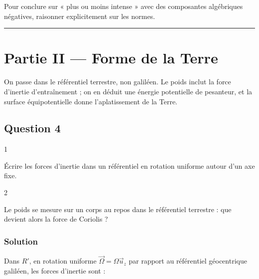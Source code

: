 \documentclass[11pt,a4paper]{article}
\newcommand{\equationajustee}[1]{%
  \sbox{\boiteequation}{$\displaystyle #1$}%
  \ifdim\wd\boiteequation>\linewidth
    \[\resizebox{\linewidth}{!}{\usebox{\boiteequation}}\]%
  \else
    \[#1\]%
  \fi}
\begin{document}
\begin{methode}

Pour conclure sur « plus ou moins intense » avec des composantes algébriques négatives, raisonner explicitement sur les normes.

\end{methode}

\begin{center}\rule{0.5\linewidth}{0.5pt}\end{center}

\hypertarget{partie-ii-forme-de-la-terre}{%
\section{Partie II --- Forme de la Terre}\label{partie-ii-forme-de-la-terre}}

On passe dans le référentiel terrestre, non galiléen. Le poids inclut la force d'inertie d'entraînement ; on en déduit une énergie potentielle de pesanteur, et la surface équipotentielle donne l'aplatissement de la Terre.

\hypertarget{question-4}{%
\subsection{Question 4}\label{question-4}}

\begin{indication}{1}

Écrire les forces d'inertie dans un référentiel en rotation uniforme autour d'un axe fixe.

\end{indication}

\begin{indication}{2}

Le poids se mesure sur un corps au repos dans le référentiel terrestre : que devient alors la force de Coriolis ?

\end{indication}

\hypertarget{solution-3}{%
\subsubsection{Solution}\label{solution-3}}

Dans \(R'\), en rotation uniforme \(\vec\Omega=\Omega\vec u_z\) par rapport au référentiel géocentrique galiléen, les forces d'inertie sont :

\equationajustee{\begin{aligned}
\vec F_{ie}&=-m\vec a_e=m\Omega^2\overrightarrow{HM}\\
\vec F_{ic}&=-2m\vec\Omega\wedge\vec v_{R'}
\end{aligned}}
\end{document}
